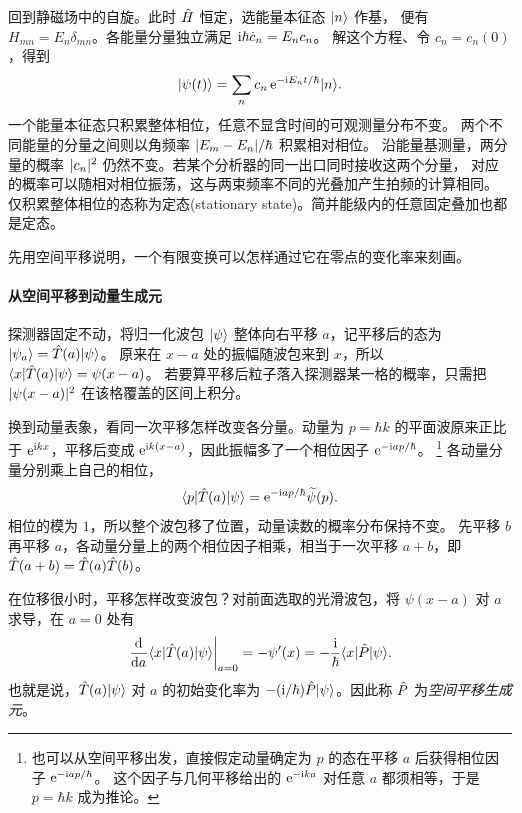 回到静磁场中的自旋。此时 $\hat{H}$ 恒定，选能量本征态 $\lvert n\rangle$ 作基，
便有 $H_{mn} = E_n\delta_{mn}$。各能量分量独立满足 $\mathrm{i}\hbar\dot c_n = E_nc_n$。
解这个方程、令 $c_n = c_n(0)$，得到
\begin{equation}
    \lvert\psi(t)\rangle = \sum_n c_n\mathop{}\!\mathrm{e}^{-\mathrm{i} E_nt/\hbar}\lvert n\rangle.
\end{equation}
一个能量本征态只积累整体相位，任意不显含时间的可观测量分布不变。
两个不同能量的分量之间则以角频率 $\lvert E_m - E_n\rvert/\hbar$ 积累相对相位。
沿能量基测量，两分量的概率 $\lvert c_n\rvert^2$ 仍然不变。若某个分析器的同一出口同时接收这两个分量，
对应的概率可以随相对相位振荡，这与两束频率不同的光叠加产生拍频的计算相同。
仅积累整体相位的态称为定态(stationary state)。简并能级内的任意固定叠加也都是定态。

先用空间平移说明，一个有限变换可以怎样通过它在零点的变化率来刻画。

\paragraph{从空间平移到动量生成元}
探测器固定不动，将归一化波包 $\lvert\psi\rangle$ 整体向右平移 $a$，记平移后的态为 $\lvert\psi_a\rangle = \hat{T}(a)\lvert\psi\rangle$。
原来在 $x - a$ 处的振幅随波包来到 $x$，所以 $\langle x\vert\hat{T}(a)\vert\psi\rangle = \psi(x - a)$。
若要算平移后粒子落入探测器某一格的概率，只需把 $\lvert\psi(x - a)\rvert^2$ 在该格覆盖的区间上积分。

换到动量表象，看同一次平移怎样改变各分量。动量为 $p = \hbar k$ 的平面波原来正比于 $\mathop{}\!\mathrm{e}^{\mathrm{i} kx}$，平移后变成 $\mathop{}\!\mathrm{e}^{\mathrm{i} k(x-a)}$，因此振幅多了一个相位因子 $\mathop{}\!\mathrm{e}^{-\mathrm{i} ap/\hbar}$。%
\footnote{也可以从空间平移出发，直接假定动量确定为 $p$ 的态在平移 $a$ 后获得相位因子 $\mathop{}\!\mathrm{e}^{-\mathrm{i} ap/\hbar}$。
这个因子与几何平移给出的 $\mathop{}\!\mathrm{e}^{-\mathrm{i} ka}$ 对任意 $a$ 都须相等，于是 $p = \hbar k$ 成为推论。}
各动量分量分别乘上自己的相位，
\begin{equation}\label{eq:qm-translation-generator}
    \langle p\vert\hat{T}(a)\vert\psi\rangle = \mathop{}\!\mathrm{e}^{-\mathrm{i} ap/\hbar}\widetilde\psi(p).
\end{equation}
相位的模为 $1$，所以整个波包移了位置，动量读数的概率分布保持不变。
先平移 $b$ 再平移 $a$，各动量分量上的两个相位因子相乘，相当于一次平移 $a + b$，即 $\hat{T}(a + b) = \hat{T}(a)\hat{T}(b)$。

在位移很小时，平移怎样改变波包？对前面选取的光滑波包，将 $\psi(x - a)$ 对 $a$ 求导，在 $a = 0$ 处有
\[
    \left.\frac{\mathop{}\!\mathrm{d}^{}}{\mathrm{d}{a}^{}}\langle x\vert\hat{T}(a)\vert\psi\rangle\right|_{a=0}
    = -\psi'(x) = -\frac{\mathrm{i}}{\hbar}\langle x\vert\hat{P}\vert\psi\rangle.
\]
也就是说，$\hat{T}(a)\lvert\psi\rangle$ 对 $a$ 的初始变化率为 $-(\mathrm{i}/\hbar)\hat{P}\lvert\psi\rangle$。因此称 $\hat{P}$ 为\emph{空间平移生成元}。

